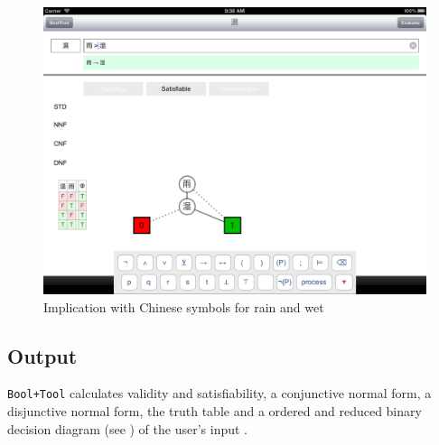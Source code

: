 \begin{figure}[htbp]
\begin{center}
\includegraphics[scale=0.18,trim=0 43cm 0cm 0, clip=true]{concept/RainHD.png}
\caption{Implication with Chinese symbols for rain and wet}
\label{fig:BoolToolChineseInput}
\end{center}
\end{figure}


\subsection{Output}

\verb=Bool+Tool= calculates validity and satisfiability, 
a conjunctive normal form, 
a disjunctive normal form, 
the truth table and a ordered and
reduced binary decision diagram 
(see ) of the user's input . 

